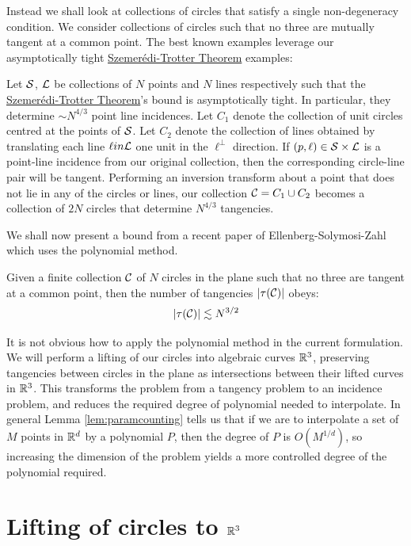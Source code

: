 Instead we shall look at collections of circles that satisfy a single non-degeneracy condition. We consider collections of circles 
such that no three are mutually tangent at a common point. The best known examples leverage our asymptotically tight \hyperref[thm:S-T]{Szemerédi-Trotter Theorem} examples:
\begin{example}
    Let $\mathcal S$, $\mathcal L$ be collections of $N$ points and $N$ lines respectively such that the \hyperref[thm:S-T]{Szemerédi-Trotter Theorem}'s bound is asymptotically tight. 
    In particular, they determine $\sim N^{4/3}$ point line incidences. 
    Let $C_1$ denote the collection of unit circles centred at the points of $\mathcal S$. 
    Let $C_2$ denote the collection of lines obtained by translating each line $\ell in \mathcal L$ one unit in the $\ell^{\perp}$ direction.
    If $(p,\ell) \in \mathcal S \times \mathcal L$ is a point-line incidence from our original collection, then the corresponding circle-line pair will be tangent.
    Performing an inversion transform about a point that does not lie in any of the circles or lines, our collection $\mathcal C = C_1 \cup C_2$ becomes a 
    collection of $2N$ circles that determine $N^{4/3}$ tangencies.
 \end{example}

We shall now present a bound from a recent paper of Ellenberg-Solymosi-Zahl which uses the polynomial method.\cite{ellenberg2016new}

\begin{theorem}
    Given a finite collection $\mathcal C$ of $N$ circles in the plane such that no three are tangent at a common point, 
    then the number of tangencies $|\tau(\mathcal C)|$ obeys:   \label{thm:circle-tangencies}
    \[
        |\tau(\mathcal C)| \lesssim N^{3/2}
    \]
\end{theorem}

It is not obvious how to apply the polynomial method in the current formulation. 
We will perform a lifting  of our circles into algebraic curves $\mathbb R^3$, 
preserving tangencies between circles in the plane as intersections between their lifted curves in $\mathbb R^3$. 
This transforms the problem from a tangency problem to an incidence problem, and reduces the required degree of polynomial needed to interpolate.
In general Lemma \ref{lem:paramcounting} tells us that if we are to interpolate a set of $M$ points in $\mathbb R^d$ by a polynomial $P$, then the degree of $P$ is $O(M^{1/d})$, 
so increasing the dimension of the problem yields a more controlled degree of the polynomial required.

\section{Lifting of circles to $\mathbb R^3$}

